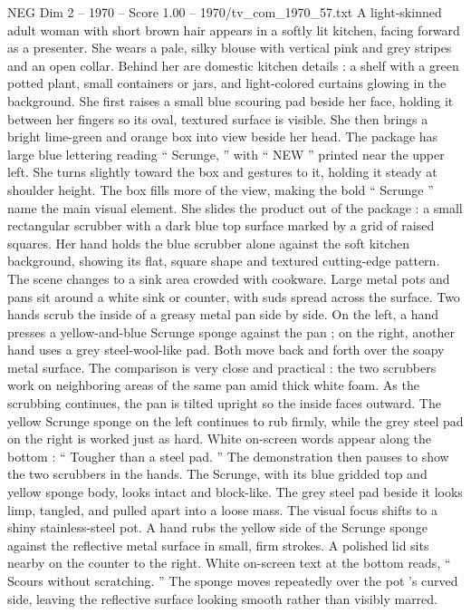 \begin{textsample}{NEG Dim 2 – 1970 – Score 1.00 – 1970/tv\_com\_1970\_57.txt}  \label{ex:f2_neg_025}
A light-skinned adult woman with short brown hair appears in a softly lit kitchen, facing forward as a presenter.
She wears a pale, silky blouse with vertical pink and grey stripes and an open collar.
Behind her are domestic kitchen details : a shelf with a green potted plant, small containers or jars, and light-colored curtains glowing in the background.
She first raises a small blue scouring pad beside her face, holding it between her fingers so its oval, textured surface is visible.
She then brings a bright lime-green and orange box into view beside her head.
The package has large blue lettering reading “ Scrunge, ” with “ NEW ” printed near the upper left.
She turns slightly toward the box and gestures to it, holding it steady at shoulder height.
The box fills more of the view, making the bold “ Scrunge ” name the main visual element.
She slides the product out of the package : a small rectangular scrubber with a dark blue top surface marked by a grid of raised squares.
Her hand holds the blue scrubber alone against the soft kitchen background, showing its flat, square shape and textured cutting-edge pattern.
The scene changes to a sink area crowded with cookware.
Large metal pots and pans sit around a white sink or counter, with suds spread across the surface.
Two hands scrub the inside of a greasy metal pan side by side.
On the left, a hand presses a yellow-and-blue Scrunge sponge against the pan ; on the right, another hand uses a grey steel-wool-like pad.
Both move back and forth over the soapy metal surface.
The comparison is very close and practical : the two scrubbers work on neighboring areas of the same pan amid thick white foam.
As the scrubbing continues, the pan is tilted upright so the inside faces outward.
The yellow Scrunge sponge on the left continues to rub firmly, while the grey steel pad on the right is worked just as hard.
White on-screen words appear along the bottom : “ Tougher than a steel pad. ” The demonstration then pauses to show the two scrubbers in the hands.
The Scrunge, with its blue gridded top and yellow sponge body, looks intact and block-like.
The grey steel pad beside it looks limp, tangled, and pulled apart into a loose mass.
The visual focus shifts to a shiny stainless-steel pot.
A hand rubs the yellow side of the Scrunge sponge against the reflective metal surface in small, firm strokes.
A polished lid sits nearby on the counter to the right.
White on-screen text at the bottom reads, “ Scours without scratching. ” The sponge moves repeatedly over the pot ’s curved side, leaving the reflective surface looking smooth rather than visibly marred.

\end{textsample}
